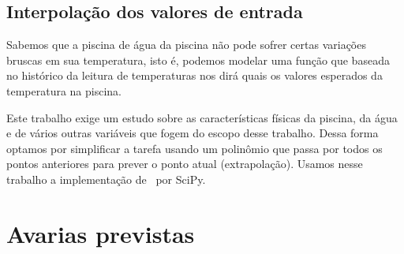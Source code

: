 \documentclass[a4paper,12pt]{article}
\begin{document}
\subsection{Interpolação dos valores de entrada}\label{sec:interpolar}
Sabemos que a piscina de água da piscina não pode sofrer certas variações
bruscas em sua temperatura, isto é, podemos modelar uma função que baseada no
histórico da leitura de temperaturas nos dirá quais os valores esperados da
temperatura na piscina.

Este trabalho exige um estudo sobre as características físicas da piscina, da
água e de vários outras variáveis que fogem do escopo desse trabalho. Dessa
forma optamos por simplificar a tarefa usando um polinômio que passa por
todos os pontos anteriores para prever o ponto atual (extrapolação). Usamos
nesse trabalho a implementação de~\cite{interpolation} por SciPy.

\section{Avarias previstas}
\end{document}
